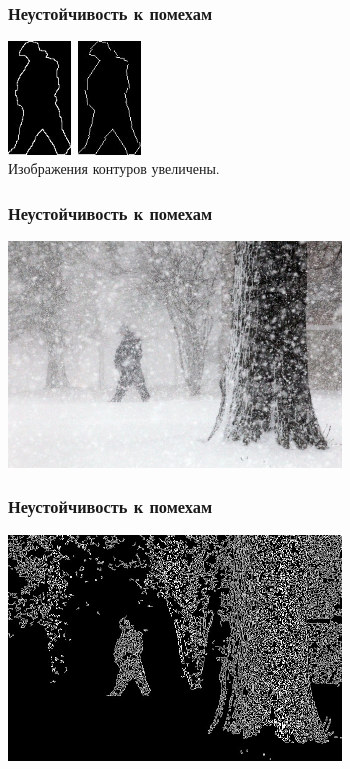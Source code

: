 \begin{frame}\frametitle{Неустойчивость к помехам}
    \begin{center}
        \includegraphics[height=3cm]{veselov_imgs/pattern2.jpg}\
        \includegraphics[height=3cm]{veselov_imgs/l_pttrn2.jpg}\\
        Изображения контуров увеличены.
    \end{center}
\end{frame}

\begin{frame}\frametitle{Неустойчивость к помехам}
    \begin{center}
        \includegraphics[height=6cm]{veselov_imgs/image2.jpg}
    \end{center}
\end{frame}

\begin{frame}\frametitle{Неустойчивость к помехам}
    \begin{center}
        \includegraphics[height=6cm]{veselov_imgs/edge_map2.jpg}
    \end{center}
\end{frame}

